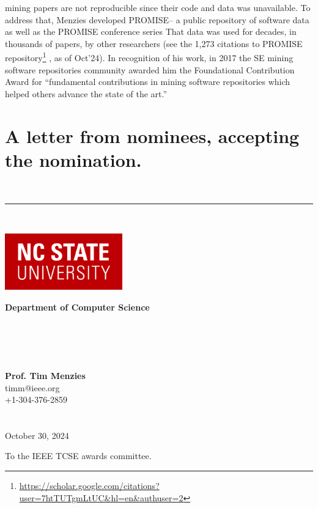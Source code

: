 \documentclass[10pt]{article}
\begin{document}
mining papers are not reproducible since their code and data was
unavailable. To address that, Menzies developed PROMISE-- a public
repository of software data as well as the PROMISE conference series
That data was used for decades, in thousands of papers, by other
researchers (see the 1,273 citations to  PROMISE repository\footnote{
\url{https://scholar.google.com/citations?user=7htTUTgmLtUC&hl=en&authuser=2}
} , as of Oct’24).
In recognition of his work, in 2017 the SE mining software repositories community awarded him the Foundational 
Contribution Award for “fundamental contributions in mining software repositories which helped others advance the state of the art.” 









\newpage
\section{A letter from nominees, accepting the nomination.}

\vspace{0.5in}
~\hrule~

\begin{minipage}{2.25in}
\includegraphics[width=2in]{logo.png}
\end{minipage}\begin{minipage}{3.75in}
{\bf Department of Computer Science} ~\\~\\~\\~\\~\\
\end{minipage}\begin{minipage}{2in}
{\bf Prof. Tim Menzies}\\ 
 timm@ieee.org\\ +1-304-376-2859	\\
 ~\\
 ~\\
 October 30, 2024
\end{minipage}
\vspace{1in}

To the IEEE TCSE awards committee.
\end{document}
